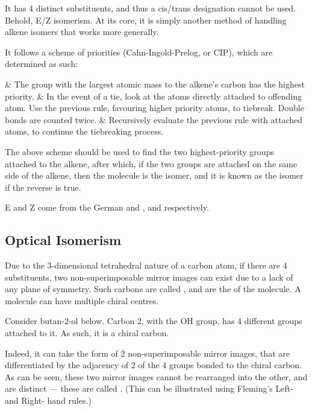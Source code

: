 			It has 4 distinct substituents, and thus a cis/trans designation cannot be used. Behold, E/Z isomerism. At its core, it
			is simply another method of handling alkene isomers that works more generally.

			It follows a scheme of priorities (Cahn-Ingold-Prelog, or CIP), which are determined as such:
			\begin{romanlist}
				& The group with the largest atomic mass  to the alkene's carbon has the highest priority.
				& In the event of a tie, look at the atoms directly attached to  offending atom. Use the previous
				  rule, favouring higher priority atoms, to tiebreak. Double bonds are counted twice.
				& Recursively evaluate the previous rule with attached atoms, to continue the tiebreaking process.
			\end{romanlist}

			The above scheme should be used to find the two highest-priority groups attached to the alkene, after which, if the two
			groups are attached on the same side of the alkene, then the molecule is the  isomer, and it is known as the
			 isomer if the reverse is true.

			E and Z come from the German  and ,  and 
			respectively.



		\pagebreak
		\subsection{Optical Isomerism}

			Due to the 3-dimensional tetrahedral nature of a carbon atom, if there are 4  substituents, two
			non-superimposable mirror images can exist due to a lack of any plane of symmetry. Such carbons are called
			, and are the  of the molecule. A molecule can have multiple chiral
			centres.

			Consider butan-2-ol below. Carbon 2, with the OH group, has 4 different groups attached to it. As such, it is a chiral carbon.


			Indeed, it can take the form of 2 non-superimposable mirror images, that are differentiated by the adjacency of 2 of
			the 4 groups bonded to the chiral carbon. As can be seen, these two mirror images cannot be rearranged into the other,
			and are distinct --- these are called . (This can be illustrated using Fleming's Left- and Right- hand rules.)

